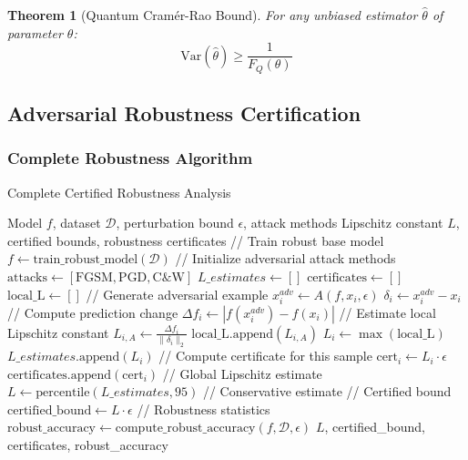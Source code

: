 \documentclass[journal]{IEEEtran}
\newtheorem{theorem}{Theorem}
\begin{document}
\begin{theorem}[Quantum Cramér-Rao Bound]
For any unbiased estimator $\hat{\theta}$ of parameter $\theta$:
$$\text{Var}(\hat{\theta}) \geq \frac{1}{F_Q(\theta)}$$
\end{theorem}

\subsection{Adversarial Robustness Certification}

\subsubsection{Complete Robustness Algorithm}

\begin{algorithm}[H]
\caption{Complete Certified Robustness Analysis}
\label{alg:robust_complete}
\begin{algorithmic}[1]
\REQUIRE Model $f$, dataset $\mathcal{D}$, perturbation bound $\epsilon$, attack methods
\ENSURE Lipschitz constant $L$, certified bounds, robustness certificates
\STATE // Train robust base model
\STATE $f \leftarrow \text{train\_robust\_model}(\mathcal{D})$
\STATE // Initialize adversarial attack methods
\STATE $\text{attacks} \leftarrow [\text{FGSM}, \text{PGD}, \text{C\&W}]$
\STATE $L\_estimates \leftarrow []$
\STATE $\text{certificates} \leftarrow []$
    \STATE $\text{local\_L} \leftarrow []$
        \STATE // Generate adversarial example
        \STATE $x_i^{adv} \leftarrow A(f, x_i, \epsilon)$
        \STATE $\delta_i \leftarrow x_i^{adv} - x_i$
        \STATE // Compute prediction change
        \STATE $\Delta f_i \leftarrow |f(x_i^{adv}) - f(x_i)|$
        \STATE // Estimate local Lipschitz constant
        \STATE $L_{i,A} \leftarrow \frac{\Delta f_i}{\|\delta_i\|_2}$
        \STATE $\text{local\_L}.\text{append}(L_{i,A})$
    \ENDFOR
    \STATE $L_i \leftarrow \max(\text{local\_L})$
    \STATE $L\_estimates.\text{append}(L_i)$
    \STATE // Compute certificate for this sample
    \STATE $\text{cert}_i \leftarrow L_i \cdot \epsilon$
    \STATE $\text{certificates}.\text{append}(\text{cert}_i)$
\ENDFOR
\STATE // Global Lipschitz estimate
\STATE $L \leftarrow \text{percentile}(L\_estimates, 95)$ // Conservative estimate
\STATE // Certified bound
\STATE $\text{certified\_bound} \leftarrow L \cdot \epsilon$
\STATE // Robustness statistics
\STATE $\text{robust\_accuracy} \leftarrow \text{compute\_robust\_accuracy}(f, \mathcal{D}, \epsilon)$
\RETURN $L$, certified\_bound, certificates, robust\_accuracy
\end{algorithmic}
\end{algorithm}
\end{document}
